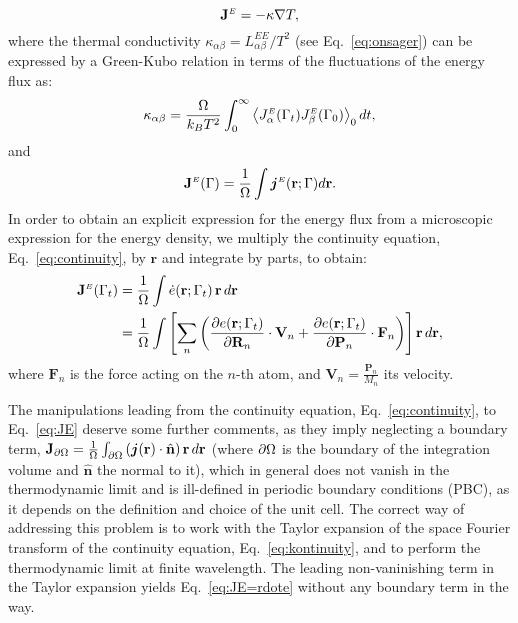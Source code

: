 \begin{equation}
  \mathbf{J}^\smallE = - \kappa \nabla T, \label{eq:thermal-constitutive}
\end{equation}
where the thermal conductivity $\kappa_{\alpha\beta}= L^{\scriptscriptstyle EE}_{\alpha \beta} / T^2$ (see Eq.~\eqref{eq:onsager}) can be expressed by a Green-Kubo relation in terms of the fluctuations of the energy flux as:
\begin{equation}
  \kappa_{\alpha\beta} =\frac{\rOmega}{k_B T^2} \int_0^\infty \left \langle J^\smallE_\alpha(\rGamma_t) J^\smallE_\beta(\rGamma_0) \right \rangle_0 dt, \label{eq:GK-complete}
\end{equation}
and
\begin{equation}
  \mathbf{J}^\smallE(\rGamma)  = \frac{1}{\rOmega} \int \bm{j}^\smallE(\mathbf{r};\rGamma) d\mathbf{r}. \label{eq:avg-current-density}
\end{equation}
In order to obtain an explicit expression for the energy flux from a microscopic expression for the energy density, we multiply the continuity equation, Eq.~\eqref{eq:continuity}, by $\mathbf{r}$ and integrate by parts, to obtain:
\begin{align}
  \mathbf{J}^\smallE(\rGamma_t) &= \frac{1}{\rOmega} \int  \dot e(\mathbf{r};\rGamma_t) \,\mathbf{r}\, d\mathbf{r} \label{eq:JE=rdote} \\
  & = \frac{1}{\rOmega} \int
  \left[ \sum_n \left(
    \frac{\partial e(\mathbf{r};\rGamma_t)}{\partial \mathbf{R}_n} \cdot \mathbf{V}_n +
    \frac{\partial e(\mathbf{r};\rGamma_t)}{\partial \mathbf{P}_n} \cdot \mathbf{F}_n
  \right)  \right] \mathbf{r}\, d\mathbf{r}, \label{eq:JE}
\end{align}
where $ \mathbf{F}_n $ is the force acting on the $n$-th atom, and $\mathbf{V}_n=\frac{\mathbf{P}_n}{M_n}$ its velocity.

The manipulations leading from the continuity equation, Eq.~\eqref{eq:continuity}, to Eq.~\eqref{eq:JE} deserve some further comments, as they imply neglecting a boundary term, $\mathbf{J}_{\partial {\mathrm\Omega}} =
\frac{1}{{\mathrm\Omega}} \int_{\partial{\mathrm\Omega}}
 \left( \bm{j}(\mathbf{r}) \cdot \hat{\mathbf{n}} \right)
\mathbf{r} \,d\mathbf{r} $  (where $ \partial{\mathrm\Omega} $ is the boundary of the integration volume and $\hat{\mathbf{n}}$ the normal to it), which in general does not vanish in the thermodynamic limit and is ill-defined in periodic boundary conditions (PBC), as it depends on the definition and choice of the unit cell. The correct way of addressing this problem is to work with the Taylor expansion of the space Fourier transform of the continuity equation, Eq.~\eqref{eq:kontinuity}, and to perform the thermodynamic limit at finite wavelength. The leading non-vaninishing term in the Taylor expansion yields Eq.~\eqref{eq:JE=rdote} without any boundary term in the way.


